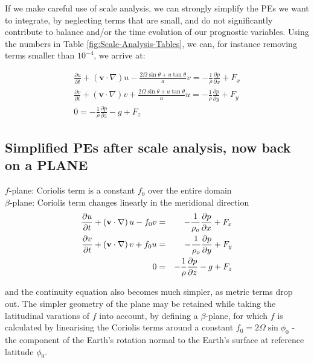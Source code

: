 If we make careful use of scale analysis, we can strongly simplify the PEs we want to integrate, by neglecting terms that are small, and do not significantly contribute to balance and/or the time evolution of our prognostic variables. Using the numbers in Table \ref{fig:Scale-Analysis-Tables}, we can, for instance removing terms smaller than $10^{-4}$, we arrive at:

\begin{eqnarray}
	\frac {\partial u}{\partial t} + \left(\mathbf{v}\cdot\nabla\right)u - \frac{2 \Omega \sin \theta + u \tan \theta}{a} v  = -\frac{1}{\rho} \frac{\partial p}{\partial x}+F_x \\
	\frac {\partial v}{\partial t} + \left(\mathbf{v}\cdot\nabla\right)v + \frac{2 \Omega \sin \theta +u \tan \theta}{a} u  = -\frac{1}{\rho} \frac{\partial p}{\partial y}+F_y \\
	0 =-\frac{1}{\rho} \frac{\partial p}{\partial z}-g+F_z
\end{eqnarray}


\subsection{Simplified PEs after scale analysis, now back on a PLANE}

$f$-plane: Coriolis term is a constant $f_0$ over the entire domain\\
$\beta$-plane: Coriolis term changes linearly in the meridional direction\\

\begin{eqnarray}
	\frac{\partial u}{\partial t} + \left( \mathbf{v} \cdot \nabla\right) u - f_0 v & = & -\frac{1}{\rho_o}\frac{\partial p}{\partial x} +F_x \\
	\frac{\partial v}{\partial t} + \left( \mathbf{v} \cdot \nabla\right) v + f_0 u & = & -\frac{1}{\rho_o}\frac{\partial p}{\partial y} +F_y \\
	0 & = & - \frac{1}{\rho} \frac{\partial p}{\partial z} - g + F_z
\end{eqnarray}

and the continuity equation also becomes much simpler, as metric terms drop out. The simpler geometry of the plane may be retained while taking the latitudinal varations of $f$ into account, by defining a $\beta$-plane, for which $f$ is calculated by linearising the Coriolis terms around a constant $f_0=2\Omega \sin\phi_0$ -
the component of the Earth's rotation normal to the Earth's surface at
reference latitude $\phi_0$. 	

